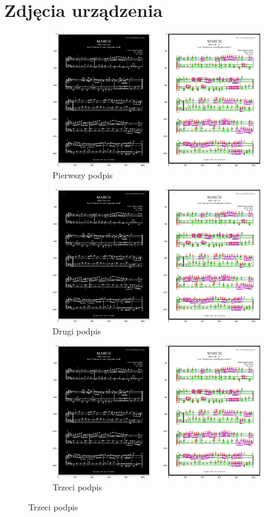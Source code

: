 \documentclass[12pt]{article}
\begin{document}
\section{Zdjęcia urządzenia}
\begin{figure}[h!]
	\centering
	\begin{subfigure}[b]{0.32\linewidth}
		\includegraphics[width=\linewidth]{Zdj0.png}
		\caption{Pierwszy podpis}
	\end{subfigure}
	\begin{subfigure}[b]{0.32\linewidth}
		\includegraphics[width=\linewidth]{Zdj0.png}
		\caption{Drugi podpis}
	\end{subfigure}
	\begin{subfigure}[b]{0.32\linewidth}
		\includegraphics[width=\linewidth]{Zdj0.png}
		\caption{Trzeci podpis}
	\end{subfigure}
	

\end{figure}
\end{document}
